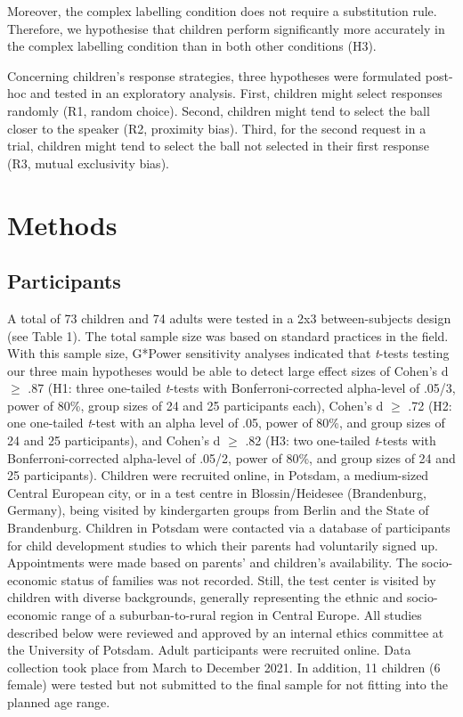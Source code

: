 \documentclass[
  man,floatsintext]{apa6}
\begin{document}
Moreover, the complex labelling condition does not require a substitution rule. Therefore, we hypothesise that children perform significantly more accurately in the complex labelling condition than in both other conditions (H3).

Concerning children's response strategies, three hypotheses were formulated post-hoc and tested in an exploratory analysis. First, children might select responses randomly (R1, random choice). Second, children might tend to select the ball closer to the speaker (R2, proximity bias). Third, for the second request in a trial, children might tend to select the ball not selected in their first response (R3, mutual exclusivity bias).

\section{Methods}\label{methods}

\subsection{Participants}\label{participants}

A total of 73 children and 74 adults were tested in a 2x3 between-subjects design (see Table 1). The total sample size was based on standard practices in the field. With this sample size, G*Power sensitivity analyses indicated that \emph{t}-tests testing our three main hypotheses would be able to detect large effect sizes of Cohen's d \(\geq\) .87 (H1: three one-tailed \emph{t}-tests with Bonferroni-corrected alpha-level of .05/3, power of 80\%, group sizes of 24 and 25 participants each), Cohen's d \(\geq\) .72 (H2: one one-tailed \emph{t}-test with an alpha level of .05, power of 80\%, and group sizes of 24 and 25 participants), and Cohen's d \(\geq\) .82 (H3: two one-tailed \emph{t}-tests with Bonferroni-corrected alpha-level of .05/2, power of 80\%, and group sizes of 24 and 25 participants). Children were recruited online, in Potsdam, a medium-sized Central European city, or in a test centre in Blossin/Heidesee (Brandenburg, Germany), being visited by kindergarten groups from Berlin and the State of Brandenburg. Children in Potsdam were contacted via a database of participants for child development studies to which their parents had voluntarily signed up. Appointments were made based on parents' and children's availability. The socio-economic status of families was not recorded. Still, the test center is visited by children with diverse backgrounds, generally representing the ethnic and socio-economic range of a suburban-to-rural region in Central Europe. All studies described below were reviewed and approved by an internal ethics committee at the University of Potsdam. Adult participants were recruited online. Data collection took place from March to December 2021. In addition, 11 children (6 female) were tested but not submitted to the final sample for not fitting into the planned age range.
\end{document}
